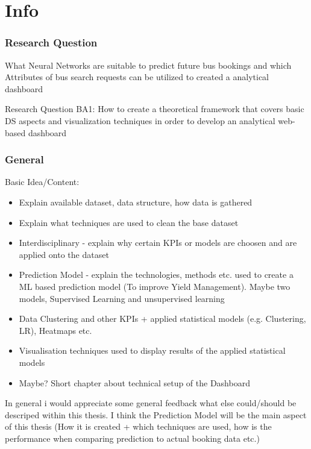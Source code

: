 %
%
% 
% 
% 

\chapter{Info}
\label{chap:info}

\subsection{Research Question}
What Neural Networks are suitable to predict future bus bookings and which Attributes of bus search requests can be utilized to created a analytical dashboard


Research Question BA1: How to create a theoretical framework that covers basic DS
aspects and visualization techniques in order to develop an analytical web-based dashboard



\subsection{General}
Basic Idea/Content: \newline

\begin{itemize}
  \item Explain available dataset, data structure, how data is gathered 
  \item Explain what techniques are used to clean the base dataset
  \item Interdisciplinary - explain why certain KPIs or models are choosen and are applied onto the dataset 
  \item Prediction Model - explain the technologies, methods etc. used to create a ML based prediction model (To improve Yield Management). Maybe two models, Supervised Learning and unsupervised learning 
  \item Data Clustering and other KPIs + applied statistical models (e.g. Clustering, LR), Heatmaps etc. 
  \item Visualisation techniques used to display results of the applied statistical models 
  \item Maybe? Short chapter about technical setup of the Dashboard   
\end{itemize}
In general i would appreciate some general feedback what else could/should be descriped within this thesis. I think the Prediction Model will be the main aspect of this thesis (How it is created + which techniques are used, how is the performance when comparing prediction to actual booking data etc.) 




